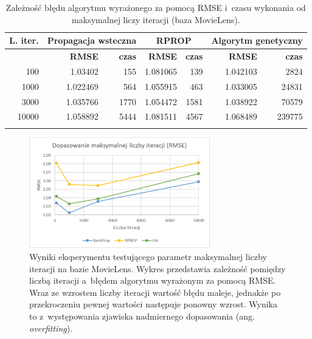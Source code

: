 \documentclass[twoside]{iisthesis}
\begin{document}
				\begin{longtable}[!ht]{r||rr|rr|rr}		
					\label{tab:expiterations}		
					\textbf{L. iter.} & \multicolumn{2}{c|}{\textbf{Propagacja wsteczna}}  & \multicolumn{2}{c|}{\textbf{RPROP}} & \multicolumn{2}{c}{\textbf{Algorytm genetyczny}}  \\
					\hline
					& \textbf{RMSE} & \textbf{czas} & \textbf{RMSE} & \textbf{czas} & \textbf{RMSE} & \textbf{czas} \\
					\hline
					100 & 1.03402 & 155 & 1.081065 & 139 & 1.042103 & 2824 \\
					1000  & 1.022469 & 564 & 1.055915 & 463 & 1.033005 & 24831  \\
					3000  & 1.035766 & 1770 & 1.054472 & 1581  & 1.038922 & 70579  \\
					10000 & 1.058892  & 5444 & 1.081511  & 4567  & 1.068489 & 239775 \\
					\caption{Zależność błędu algorytmu wyrażonego za pomocą RMSE i~czasu wykonania od maksymalnej liczy iteracji (baza MovieLens).}
				\end{longtable}
				
				\begin{figure}[!ht]
					\centering
					\includegraphics[width=0.7\textwidth]{expiterations_rmse}			
					\caption{Wyniki eksperymentu testującego parametr maksymalnej liczby iteracji na bazie MovieLens. Wykres przedstawia zależność pomiędzy liczbą iteracji a~błędem algorytmu wyrażonym za pomocą RMSE. Wraz ze wzrostem liczby iteracji wartość błędu maleje, jednakże po przekroczeniu pewnej wartości następuje ponowny wzrost. Wynika to z~występowania zjawiska nadmiernego dopasowania (ang. \textit{overfitting}). }
					\label{fig:expiterations_rmse}
				\end{figure}
			
\end{document}
